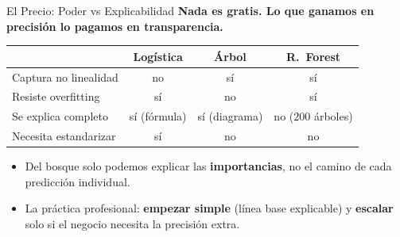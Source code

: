 \documentclass[aspectratio=169, 11pt]{beamer}
\begin{document}
\begin{frame}[shrink=10]{El Precio: Poder vs Explicabilidad}
  \vspace{-4pt}
  {\small\color{arcaDark}\bfseries
    Nada es gratis. Lo que ganamos en precisión lo pagamos en transparencia.}

  \vspace{6pt}
  \centering
  {\footnotesize
  \renewcommand{\arraystretch}{1.5}
  \begin{tabular}{@{}p{3.4cm} c c c@{}}
    \toprule
    & {\bfseries\color{arcaDark} Logística} & {\bfseries\color{arcaDark} Árbol} & {\bfseries\color{arcaDark} R.\ Forest} \\
    \midrule
    \rowcolor{arcaGray}
    Captura no linealidad & \color{arcaRed}no & \color{codeGreen}sí & \color{codeGreen}sí \\
    Resiste overfitting & \color{codeGreen}sí & \color{arcaRed}no & \color{codeGreen}sí \\
    \rowcolor{arcaGray}
    Se explica completo & \color{codeGreen}sí (fórmula) & \color{codeGreen}sí (diagrama) & \color{arcaRed}no (200 árboles) \\
    Necesita estandarizar & sí & no & no \\
    \bottomrule
  \end{tabular}
  }

  \vspace{8pt}
  {\footnotesize\color{textMuted}
  \begin{itemize}\setlength{\itemsep}{4pt}
    \item[{\color{arcaRed}\scriptsize\faArrowRight}]
      Del bosque solo podemos explicar las \textbf{importancias}, no el camino
      de cada predicción individual.
    \item[{\color{codeGreen}\scriptsize\faCheck}]
      La práctica profesional: \textbf{empezar simple} (línea base explicable) y
      \textbf{escalar} solo si el negocio necesita la precisión extra.
  \end{itemize}
  }
\end{frame}
\end{document}
